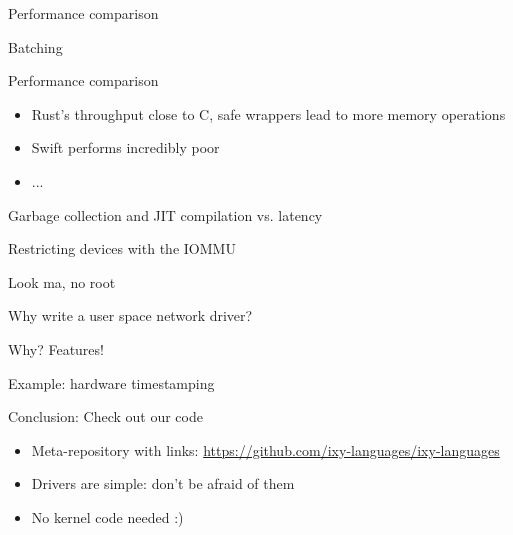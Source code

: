 \documentclass[NET,english,aspectratio=169,notitleframe]{tumbeamer}
\begin{document}
\begin{frame}{Performance comparison}
\centering
\end{frame}

\begin{frame}{Batching}
\centering
\end{frame}

\begin{frame}{Performance comparison}
\begin{itemize}
\item Rust's throughput close to C, safe wrappers lead to more memory operations
\item Swift performs incredibly poor
\item ...
\end{itemize}
\end{frame}

\begin{frame}{Garbage collection and JIT compilation vs. latency}
\end{frame}


\begin{frame}{Restricting devices with the IOMMU}
\end{frame}

\begin{frame}{Look ma, no root}
\end{frame}


\begin{frame}{Why write a user space network driver?}
\end{frame}


\begin{frame}{Why? Features!}
\end{frame}

\begin{frame}{Example: hardware timestamping}
\end{frame}


\begin{frame}{Conclusion: Check out our code}
\begin{itemize}
\item Meta-repository with links: \url{https://github.com/ixy-languages/ixy-languages}
\item Drivers are simple: don't be afraid of them
\item No kernel code needed :)
\end{itemize}
\end{frame}
\end{document}
